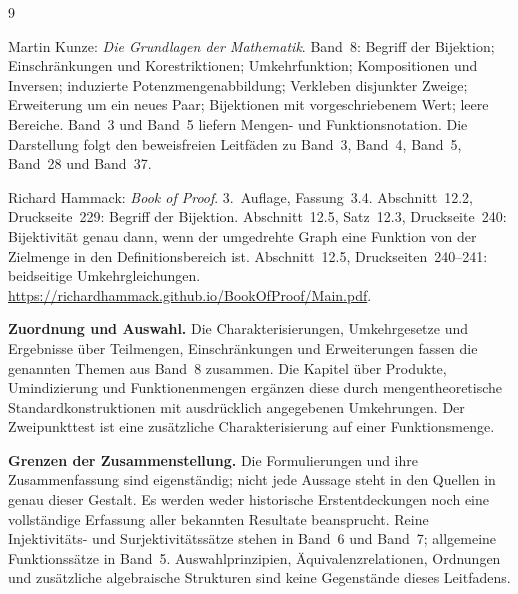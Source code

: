 \renewcommand{\bibname}{Quellen und Bandzuordnung}
\begin{thebibliography}{9}
\footnotesize
\setlength{\itemsep}{4pt}
\setlength{\parskip}{0pt}

Martin Kunze: \emph{Die Grundlagen der Mathematik}.
Band~8: Begriff der Bijektion; Einschränkungen und Korestriktionen;
Umkehrfunktion; Kompositionen und Inversen; induzierte
Potenzmengenabbildung; Verkleben disjunkter Zweige;
Erweiterung um ein neues Paar; Bijektionen mit vorgeschriebenem Wert;
leere Bereiche. Band~3 und Band~5 liefern Mengen- und Funktionsnotation.
Die Darstellung folgt den beweisfreien Leitfäden zu Band~3,
Band~4, Band~5, Band~28 und Band~37.

Richard Hammack: \emph{Book of Proof}.
3.~Auflage, Fassung~3.4.
Abschnitt~12.2, Druckseite~229: Begriff der Bijektion.
Abschnitt~12.5, Satz~12.3, Druckseite~240:
Bijektivität genau dann, wenn der umgedrehte Graph eine
Funktion von der Zielmenge in den Definitionsbereich ist.
Abschnitt~12.5, Druckseiten~240--241: beidseitige Umkehrgleichungen.
\url{https://richardhammack.github.io/BookOfProof/Main.pdf}.

\end{thebibliography}

\noindent\textbf{Zuordnung und Auswahl.}
Die Charakterisierungen, Umkehrgesetze und Ergebnisse über
Teilmengen, Einschränkungen und Erweiterungen fassen die genannten
Themen aus Band~8 zusammen. Die Kapitel über Produkte,
Umindizierung und Funktionenmengen ergänzen diese durch
mengentheoretische Standardkonstruktionen mit ausdrücklich
angegebenen Umkehrungen. Der Zweipunkttest ist eine zusätzliche
Charakterisierung auf einer Funktionsmenge.

\medskip
\noindent\textbf{Grenzen der Zusammenstellung.}
Die Formulierungen und ihre Zusammenfassung sind eigenständig;
nicht jede Aussage steht in den Quellen in genau dieser Gestalt.
Es werden weder historische Erstentdeckungen noch eine vollständige
Erfassung aller bekannten Resultate beansprucht.
Reine Injektivitäts- und Surjektivitätssätze stehen in Band~6 und
Band~7; allgemeine Funktionssätze in Band~5. Auswahlprinzipien,
Äquivalenzrelationen, Ordnungen und zusätzliche algebraische
Strukturen sind keine Gegenstände dieses Leitfadens.
